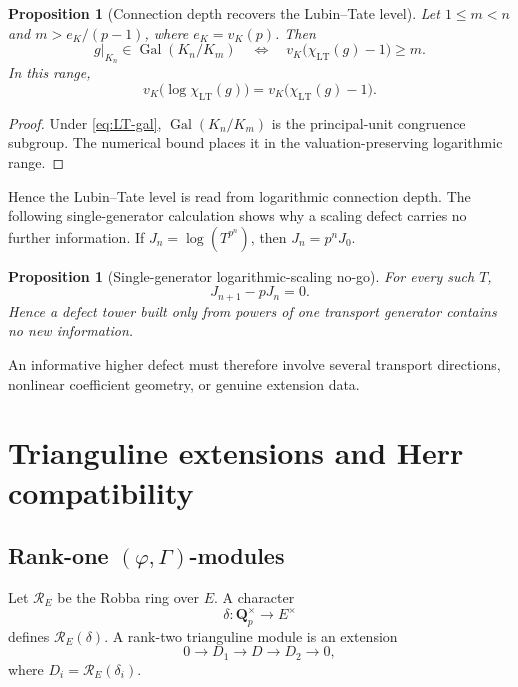 \documentclass[11pt]{article}
\newtheorem{proposition}[theorem]{Proposition}
\theoremstyle{definition}
\newcommand{\Qp}{\mathbf Q_p}
\newcommand{\Gal}{\operatorname{Gal}}
\newcommand{\cR}{\mathcal R}
\begin{document}
\begin{proposition}[Connection depth recovers the Lubin--Tate level]\label{prop:LT-depth}
Let $1\le m<n$ and $m>e_K/(p-1)$, where $e_K=v_K(p)$.  Then
\[
g|_{K_n}\in\Gal(K_n/K_m)
\quad\Longleftrightarrow\quad
v_K\bigl(\chi_{\mathrm{LT}}(g)-1\bigr)\ge m.
\]
In this range,
\[
v_K\bigl(\log\chi_{\mathrm{LT}}(g)\bigr)
=v_K\bigl(\chi_{\mathrm{LT}}(g)-1\bigr).
\]
\end{proposition}

\begin{proof}
Under \eqref{eq:LT-gal}, $\Gal(K_n/K_m)$ is the principal-unit congruence subgroup.  The numerical bound places it in the valuation-preserving logarithmic range.
\end{proof}

Hence the Lubin--Tate level is read from logarithmic connection depth.  The following single-generator calculation shows why a scaling defect carries no further information.  If $J_n=\log(T^{p^n})$, then $J_n=p^nJ_0$.

\begin{proposition}[Single-generator logarithmic-scaling no-go]\label{prop:rank1-nogo}
For every such $T$,
\[
J_{n+1}-pJ_n=0.
\]
Hence a defect tower built only from powers of one transport generator contains no new information.
\end{proposition}

An informative higher defect must therefore involve several transport directions, nonlinear coefficient geometry, or genuine extension data.

\section{Trianguline extensions and Herr compatibility}

\subsection{Rank-one \texorpdfstring{$(\varphi,\Gamma)$}{(phi,Gamma)}-modules}

Let $\cR_E$ be the Robba ring over $E$.  A character
\[
\delta:\Qp^\times\longrightarrow E^\times
\]
defines $\cR_E(\delta)$.  A rank-two trianguline module is an extension \cite{ColmezTrianguline,BergerTrianguline}
\begin{equation}\label{eq:trianguline-extension}
0\longrightarrow D_1\longrightarrow D\longrightarrow D_2\longrightarrow0,
\end{equation}
where $D_i=\cR_E(\delta_i)$.
\end{document}
